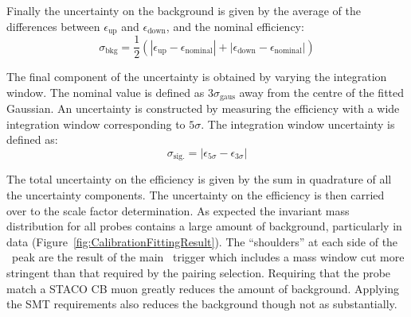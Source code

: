 Finally the uncertainty on the background is given by the average of the differences between $\epsilon_{\textrm{up}}$ and $\epsilon_{\textrm{down}}$, and the nominal efficiency:
%
\begin{equation}
  \sigma_{\textrm{bkg}} = \frac{1}{2}(|\epsilon_{\textrm{up}}-\epsilon_{\textrm{nominal}}| + |\epsilon_{\textrm{down}}-\epsilon_{\textrm{nominal}}|)
\end{equation}

The final component of the uncertainty is obtained by varying the integration window. The nominal value is defined as $3\sigma_{\textrm{gaus}}$ away from the centre of the fitted Gaussian. An uncertainty is constructed by measuring the efficiency with a wide integration window corresponding to $5\sigma$. The integration window uncertainty is defined as:
%
\begin{equation}
  \sigma_{\textrm{sig.}} = |\epsilon_{5\sigma}-\epsilon_{3\sigma}|
\end{equation}

The total uncertainty on the efficiency is given by the sum in quadrature of all the uncertainty components. The uncertainty on the efficiency is then carried over to the scale factor determination.
As expected the invariant mass distribution for all probes contains a large amount of background, particularly in data (Figure~\ref{fig:CalibrationFittingResult}). The ``shoulders'' at each side of the \jpsi\ peak are the result of the main \jpsi\ trigger which includes a mass window cut more stringent than that required by the pairing selection. Requiring that the probe match a STACO CB muon greatly reduces the amount of background. Applying the SMT requirements also reduces the background though not as substantially.

